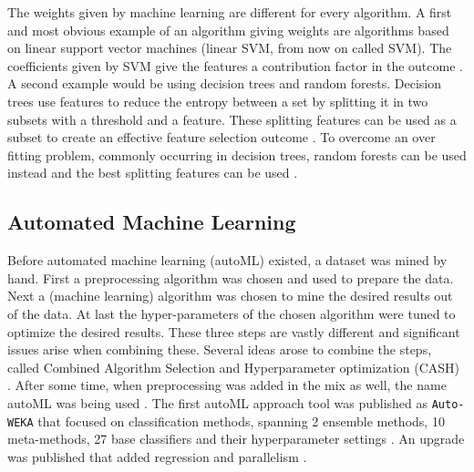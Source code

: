 \documentclass[10pt,a4paper]{report}
\begin{document}
	The weights given by machine learning are different for every algorithm. A first and most obvious example of an algorithm giving weights are algorithms based on linear support vector machines (linear SVM, from now on called SVM). The coefficients given by SVM give the features a contribution factor in the outcome \cite{jong2004feature, prados2004mining, zhang2006recursive, guyon2002gene}. A second example would be using decision trees and random forests. Decision trees use features to reduce the entropy between a set by splitting it in two subsets with a threshold and a feature. These splitting features can be used as a subset to create an effective feature selection outcome \cite{geurts2005proteomic, wu2003comparison, Duch2006}. To overcome an over fitting problem, commonly occurring in decision trees, random forests can be used instead and the best splitting features can be used \cite{liaw2002classification}.
	
	
	
	
	
	\subsection{Automated Machine Learning}
	\label{FSsubsec:AutomatedMachineLearning}
	
	Before automated machine learning (autoML) existed, a dataset was mined by hand. First a preprocessing algorithm was chosen and used to prepare the data. Next a (machine learning) algorithm was chosen to mine the desired results out of the data. At last the hyper-parameters of the chosen algorithm were tuned to optimize the desired results. These three steps are vastly different and significant issues arise when combining these. Several ideas arose to combine the steps, called Combined Algorithm Selection and Hyperparameter optimization (CASH) \cite{thornton2013auto}. After some time, when preprocessing was added in the mix as well, the name autoML was being used \cite{Gijsbers2017Thesis}. The first autoML approach tool was published as \texttt{Auto-WEKA} that focused on classification methods, spanning 2 ensemble methods, 10 meta-methods, 27 base classifiers and their hyperparameter settings \cite{thornton2013auto}. An upgrade was published that added regression and parallelism \cite{kotthoff2016auto}.   
	
\end{document}
